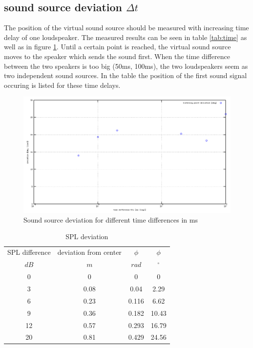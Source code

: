 \documentclass{article}
\begin{document}
\subsection{sound source deviation $\Delta t$}
The position of the virtual sound source should be measured with increasing time delay of one loudspeaker. The measured results can be seen in table \ref{tab:time} as well as in figure \ref{fig:timedelay}. Until a certain point is reached, the virtual sound source moves to the speaker which sends the sound first. When the time difference between the two speakers is too big (50ms, 100ms), the two loudspeakers seem as two independent sound sources. In the table the position of the first sound signal occuring is listed for these time delays. 
\begin{figure}[htbp]
\begin{center}
\includegraphics[width=15cm,keepaspectratio=true]{timedifference}
\caption{Sound source deviation for different time differences in ms}
\label{fig:timedelay}
\end{center}
\end{figure}

\begin{table}
\begin{center}
\begin{tabular}{|c||c||c|c|}
\hline
SPL difference & deviation from center & $\phi$ & $\phi$ \\
$dB$	&	$m$	&	$rad$	&	$^\circ$		\\
\hline
\hline
0 & 0 & 0 & 0\\
\hline
3 & 0.08 & 0.04 & 2.29 \\
\hline
6 & 0.23 & 0.116 & 6.62\\
\hline
9 & 0.36 & 0.182 & 10.43\\
\hline
12 & 0.57 & 0.293 & 16.79\\
\hline
20 & 0.81 & 0.429 & 24.56\\
\hline
\end{tabular}
\caption{SPL deviation}
\label{tab:SPL}
\end{center}
\end{table}
\end{document}
